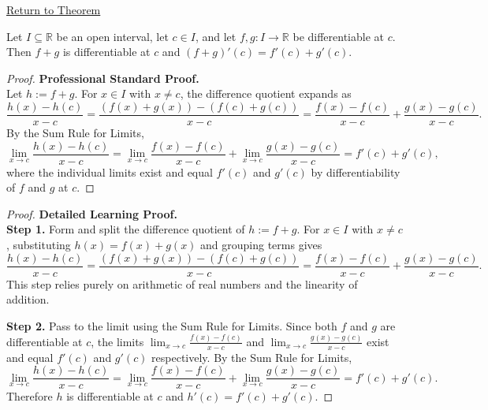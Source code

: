 \newpage
{}
\label{prf:sum-rule}

\begin{remark*}[Return]
\hyperref[thm:sum-rule]{Return to Theorem}
\end{remark*}

\begin{theorem*}
Let $I \subseteq \mathbb{R}$ be an open interval, let $c \in I$, and let $f, g : I \to \mathbb{R}$ be differentiable at $c$. Then $f + g$ is differentiable at $c$ and $(f + g)'(c) = f'(c) + g'(c)$.
\end{theorem*}

\begin{proof}
\textbf{Professional Standard Proof.}~\\
Let $h := f + g$. For $x \in I$ with $x \neq c$, the difference quotient expands as
\[
  \frac{h(x) - h(c)}{x - c} = \frac{(f(x) + g(x)) - (f(c) + g(c))}{x - c} = \frac{f(x) - f(c)}{x - c} + \frac{g(x) - g(c)}{x - c}.
\]
By the Sum Rule for Limits,
\[
  \lim_{x \to c} \frac{h(x) - h(c)}{x - c} = \lim_{x \to c} \frac{f(x) - f(c)}{x - c} + \lim_{x \to c} \frac{g(x) - g(c)}{x - c} = f'(c) + g'(c),
\]
where the individual limits exist and equal $f'(c)$ and $g'(c)$ by differentiability of $f$ and $g$ at $c$.
\end{proof}

\begin{proof}
\textbf{Detailed Learning Proof.}~\\

\textbf{Step 1.} Form and split the difference quotient of $h := f + g$. For $x \in I$ with $x \neq c$, substituting $h(x) = f(x) + g(x)$ and grouping terms gives
\[
  \frac{h(x) - h(c)}{x - c} = \frac{(f(x) + g(x)) - (f(c) + g(c))}{x - c} = \frac{f(x) - f(c)}{x - c} + \frac{g(x) - g(c)}{x - c}.
\]
This step relies purely on arithmetic of real numbers and the linearity of addition.

\textbf{Step 2.} Pass to the limit using the Sum Rule for Limits. Since both $f$ and $g$ are differentiable at $c$, the limits $\lim_{x \to c} \frac{f(x) - f(c)}{x - c}$ and $\lim_{x \to c} \frac{g(x) - g(c)}{x - c}$ exist and equal $f'(c)$ and $g'(c)$ respectively. By the Sum Rule for Limits,
\[
  \lim_{x \to c} \frac{h(x) - h(c)}{x - c} = \lim_{x \to c} \frac{f(x) - f(c)}{x - c} + \lim_{x \to c} \frac{g(x) - g(c)}{x - c} = f'(c) + g'(c).
\]
Therefore $h$ is differentiable at $c$ and $h'(c) = f'(c) + g'(c)$.
\end{proof}

